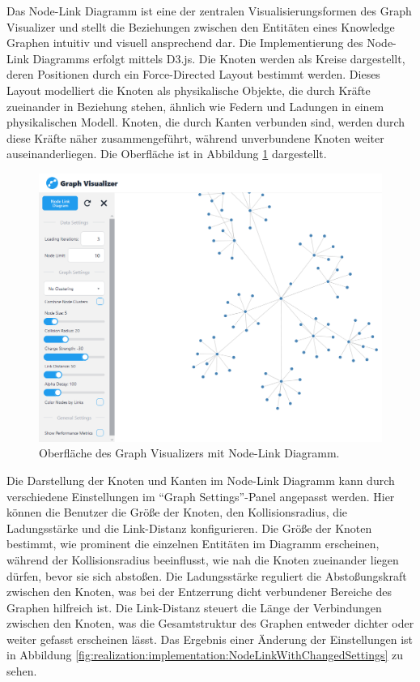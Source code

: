 Das Node-Link Diagramm ist eine der zentralen Visualisierungsformen des Graph Visualizer und stellt die Beziehungen zwischen den Entitäten eines Knowledge Graphen intuitiv und visuell ansprechend dar. Die Implementierung des Node-Link Diagramms erfolgt mittels D3.js. Die Knoten werden als Kreise dargestellt, deren Positionen durch ein Force-Directed Layout bestimmt werden. Dieses Layout modelliert die Knoten als physikalische Objekte, die durch Kräfte zueinander in Beziehung stehen, ähnlich wie Federn und Ladungen in einem physikalischen Modell. Knoten, die durch Kanten verbunden sind, werden durch diese Kräfte näher zusammengeführt, während unverbundene Knoten weiter auseinanderliegen. Die Oberfläche ist in Abbildung \ref{fig:realization:implementation:GraphViewWithSettings} dargestellt.

\begin{figure}[h]
    \centering
    \includegraphics[height=.5\textwidth]{images/03/GraphViewWithSettings.png}
    \caption{Oberfläche des Graph Visualizers mit Node-Link Diagramm.}
    \label{fig:realization:implementation:GraphViewWithSettings}
\end{figure}

Die Darstellung der Knoten und Kanten im Node-Link Diagramm kann durch verschiedene Einstellungen im \enquote{Graph Settings}-Panel angepasst werden. Hier können die Benutzer die Größe der Knoten, den Kollisionsradius, die Ladungsstärke und die Link-Distanz konfigurieren. Die Größe der Knoten bestimmt, wie prominent die einzelnen Entitäten im Diagramm erscheinen, während der Kollisionsradius beeinflusst, wie nah die Knoten zueinander liegen dürfen, bevor sie sich abstoßen. Die Ladungsstärke reguliert die Abstoßungskraft zwischen den Knoten, was bei der Entzerrung dicht verbundener Bereiche des Graphen hilfreich ist. Die Link-Distanz steuert die Länge der Verbindungen zwischen den Knoten, was die Gesamtstruktur des Graphen entweder dichter oder weiter gefasst erscheinen lässt. Das Ergebnis einer Änderung der Einstellungen ist in Abbildung \ref{fig:realization:implementation:NodeLinkWithChangedSettings} zu sehen.

